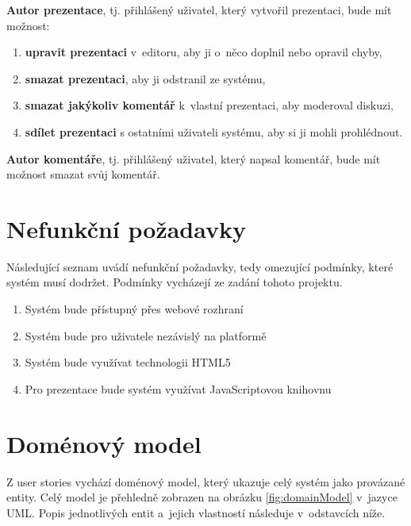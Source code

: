 \documentclass[11pt,twoside,a4paper]{book}
\begin{document}
\noindent \textbf{Autor prezentace}, tj. přihlášený uživatel, který vytvořil prezentaci, bude mít možnost:
\begin{enumerate}
	\item \textbf{upravit prezentaci} v~editoru, aby ji o~něco doplnil nebo opravil chyby,
	\item \textbf{smazat prezentaci}, aby ji odstranil ze systému,
	\item \textbf{smazat jakýkoliv komentář} k~vlastní prezentaci, aby moderoval diskuzi,
	\item \textbf{sdílet prezentaci} s ostatními uživateli systému, aby si ji mohli prohlédnout.
\end{enumerate}


\noindent \textbf{Autor komentáře}, tj. přihlášený uživatel, který napsal komentář, bude mít možnost smazat svůj komentář.


\section{Nefunkční požadavky}
Následující seznam uvádí nefunkční požadavky, tedy omezující podmínky, které systém musí dodržet. Podmínky vycházejí ze zadání tohoto projektu.

\begin{enumerate}
	\item Systém bude přístupný přes webové rozhraní
	\item Systém bude pro uživatele nezávislý na platformě
	\item Systém bude využívat technologii HTML5
	\item Pro prezentace bude systém využívat Java\-Scriptovou knihovnu
\end{enumerate}



\section{Doménový model}
Z user stories vychází doménový model, který ukazuje celý systém jako provázané entity. Celý model je přehledně zobrazen na obrázku \ref{fig:domainModel} v~jazyce UML. Popis jednotlivých entit a~jejich vlastností následuje v~odstavcích níže.
\end{document}
